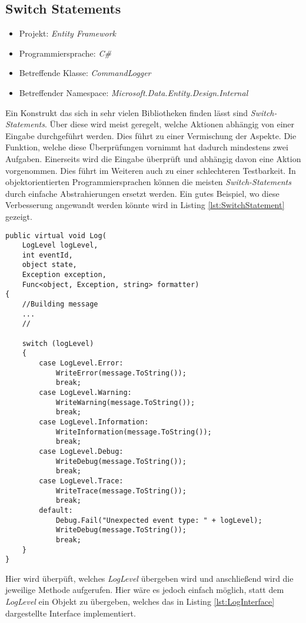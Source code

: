 \subsection{Switch Statements}
\begin{itemize}
	\item Projekt: \textit{Entity Framework}
	\item Programmiersprache: \textit{C\#}
	\item Betreffende Klasse: \textit{CommandLogger }
	\item Betreffender Namespace: \textit{Microsoft.Data.Entity.Design.Internal}
\end{itemize}

\SuperPar Ein Konstrukt das sich in sehr vielen Bibliotheken finden lässt sind \textit{Switch-Statements}. Über diese wird meist geregelt, welche Aktionen abhängig von einer Eingabe durchgeführt werden. Dies führt zu einer Vermischung der Aspekte. Die Funktion, welche diese Überprüfungen vornimmt hat dadurch mindestens zwei Aufgaben. Einerseits wird die Eingabe überprüft und abhängig davon eine Aktion vorgenommen. Dies führt im Weiteren auch zu einer schlechteren Testbarkeit. In objektorientierten Programmiersprachen können die meisten \textit{Switch-Statements} durch einfache Abstrahierungen ersetzt werden. Ein gutes Beispiel, wo diese Verbesserung angewandt werden könnte wird in Listing \ref{lst:SwitchStatement} gezeigt.

\begin{lstlisting}[language={[Sharp]C}, caption=Beispiele für Switch Statement; label=lst:SwitchStatement]
public virtual void Log(
	LogLevel logLevel,
	int eventId,
	object state,
	Exception exception,
	Func<object, Exception, string> formatter)
{
	//Building message
	...
	//

	switch (logLevel)
	{
		case LogLevel.Error:
			WriteError(message.ToString());
			break;
		case LogLevel.Warning:
			WriteWarning(message.ToString());
			break;
		case LogLevel.Information:
			WriteInformation(message.ToString());
			break;
		case LogLevel.Debug:
			WriteDebug(message.ToString());
			break;
		case LogLevel.Trace:
			WriteTrace(message.ToString());
			break;
		default:
			Debug.Fail("Unexpected event type: " + logLevel);
			WriteDebug(message.ToString());
			break;
	}
}
\end{lstlisting}

\SuperPar Hier wird überpüft, welches \textit{LogLevel} übergeben wird und anschließend wird die jeweilige Methode aufgerufen. Hier wäre es jedoch einfach möglich, statt dem \textit{LogLevel}  ein Objekt zu übergeben, welches das in Listing \ref{lst:LogInterface} dargestellte Interface implementiert.

